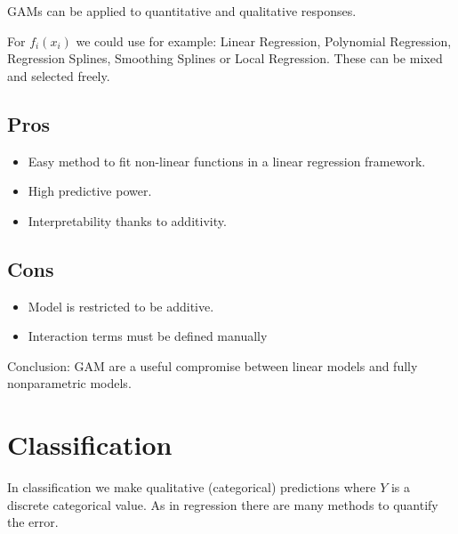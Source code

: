 \documentclass[../Main.tex]{subfiles}
\begin{document}
GAMs can be applied to quantitative and qualitative responses.


For \(f_i(x_i)\) we could use for example: Linear Regression, Polynomial Regression, Regression Splines,
Smoothing Splines or Local Regression. These can be mixed and selected freely.

\subsection{Pros}
\begin{itemize}
    \item Easy method to fit non-linear functions in a linear regression framework.
    \item High predictive power.
    \item Interpretability thanks to additivity.
\end{itemize}
\subsection{Cons}
\begin{itemize}
    \item Model is restricted to be additive.
    \item Interaction terms must be defined manually
\end{itemize}
Conclusion: GAM are a useful compromise between linear models and fully nonparametric models.

\newpage
\section{Classification}
In classification we make qualitative (categorical) predictions where \(Y\) is a discrete categorical value.
As in regression there are many methods to quantify the error.
\end{document}
